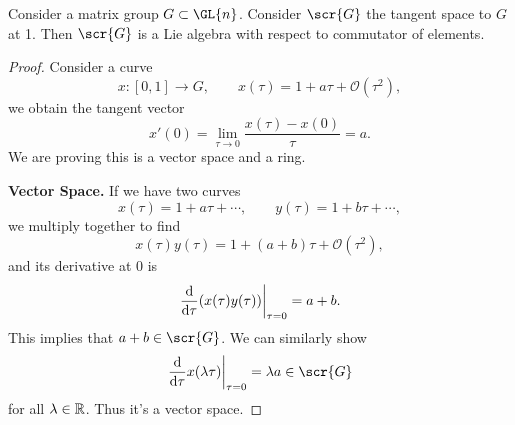 \begin{thm}
Consider a matrix group $G\subset\GL{n}$. Consider $\scr{G}$ the
tangent space to $G$ at 1. Then $\scr{G}$ is a Lie algebra with
respect to commutator of elements.
\end{thm}
\begin{proof}
Consider a curve
\begin{equation}
x\colon[0,1]\to G,\qquad x(\tau)=1+a\tau+\mathcal{O}(\tau^{2}),
\end{equation}
we obtain the tangent vector
\begin{equation}
x'(0)=\lim_{\tau\to0}\frac{x(\tau)-x(0)}{\tau}=a.
\end{equation}
We are proving this is a vector space and a ring.

\noindent\textbf{Vector Space.} If we have two
curves
\begin{equation}
x(\tau)=1+a\tau+\cdots,\qquad y(\tau)=1+b\tau+\cdots,
\end{equation}
we multiply together to find
\begin{equation}
x(\tau)y(\tau)=1+(a+b)\tau+\mathcal{O}(\tau^{2}),
\end{equation}
and its derivative at 0 is
\begin{equation}
\left.\frac{\mathrm{d} }{\mathrm{d} \tau}(x(\tau)y(\tau))\right|_{\tau=0}=a+b.
\end{equation}
This implies that $a+b\in\scr{G}$. We can similarly show
\begin{equation}
\left.\frac{\D }{\D \tau}x(\lambda\tau)\right|_{\tau=0}=\lambda a\in\scr{G}
\end{equation}
for all $\lambda\in\Bbb{R}$. Thus it's a vector space.


\end{proof}
